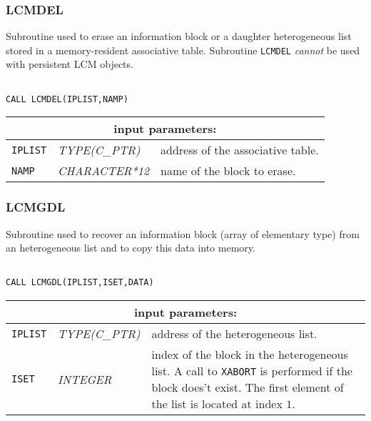 \subsubsection{LCMDEL}

Subroutine used to erase an information block or a daughter heterogeneous list stored in a memory-resident associative table.
Subroutine {\tt LCMDEL} {\sl cannot} be used with persistent LCM objects.

\begin{verbatim}

CALL LCMDEL(IPLIST,NAMP)
\end{verbatim}

\noindent
\begin{tabular}{|p{1.5cm}|p{3cm}|p{10cm}|}
\hline
\multicolumn{3}{|c|}{\bf input parameters:} \\
\hline
{\tt IPLIST} & {\it TYPE(C\_PTR)} & address of the associative table. \\
\hline
{\tt NAMP} & {\it CHARACTER*12} & name of the block to erase. \\
\hline
\end{tabular}

\subsubsection{LCMGDL}

Subroutine used to recover an information block (array of elementary type) from an heterogeneous list and to copy
this data into memory.

\begin{verbatim}

CALL LCMGDL(IPLIST,ISET,DATA)
\end{verbatim}

\noindent
\begin{tabular}{|p{1.5cm}|p{3cm}|p{10cm}|}
\hline
\multicolumn{3}{|c|}{\bf input parameters:} \\
\hline
{\tt IPLIST} & {\it TYPE(C\_PTR)} & address of the heterogeneous list. \\
\hline
{\tt ISET} & {\it INTEGER} & index of the block in the heterogeneous list. A call to {\tt XABORT} 
                                   is performed if the block does't exist.
The first element of the list is located at index $1$.\\
\hline
\end{tabular}

\vskip 0.8cm

